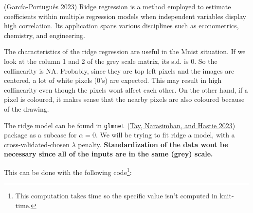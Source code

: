 \documentclass[
  10pt,
]{article}
\newenvironment{Shaded}{\begin{snugshade}}{\end{snugshade}}
\newcommand{\AttributeTok}[1]{\textcolor[rgb]{0.13,0.29,0.53}{#1}}
\newcommand{\CommentTok}[1]{\textcolor[rgb]{0.56,0.35,0.01}{\textit{#1}}}
\newcommand{\ConstantTok}[1]{\textcolor[rgb]{0.56,0.35,0.01}{#1}}
\newcommand{\DecValTok}[1]{\textcolor[rgb]{0.00,0.00,0.81}{#1}}
\newcommand{\FloatTok}[1]{\textcolor[rgb]{0.00,0.00,0.81}{#1}}
\newcommand{\FunctionTok}[1]{\textcolor[rgb]{0.13,0.29,0.53}{\textbf{#1}}}
\newcommand{\NormalTok}[1]{#1}
\newcommand{\OtherTok}[1]{\textcolor[rgb]{0.56,0.35,0.01}{#1}}
\newcommand{\SpecialCharTok}[1]{\textcolor[rgb]{0.81,0.36,0.00}{\textbf{#1}}}
\newcommand{\StringTok}[1]{\textcolor[rgb]{0.31,0.60,0.02}{#1}}
\begin{document}
(\protect\hyperlink{ref-Garcia-Portugues2023}{García-Portugués 2023})
Ridge regression is a method employed to estimate coefficients within
multiple regression models when independent variables display high
correlation. Its application spans various disciplines such as
econometrics, chemistry, and engineering.

The characteristics of the ridge regression are useful in the Mnist
situation. If we look at the column 1 and 2 of the grey scale matrix,
its s.d. is 0. So the collinearity is NA. Probably, since they are top
left pixels and the images are centered, a lot of white pixels (\(0\)'s)
are expected. This may result in high collinearity even though the
pixels wont affect each other. On the other hand, if a pixel is
coloured, it makes sense that the nearby pixels are also coloured
because of the drawing.

The ridge model can be found in \texttt{glmnet}
(\protect\hyperlink{ref-glmnet}{Tay, Narasimhan, and Hastie 2023})
package as a subcase for \(\alpha=0\). We will be trying to fit ridge a
model, with a cross-validated-chosen \(\lambda\) penalty.
\textbf{Standardization of the data wont be necessary since all of the
inputs are in the same (grey) scale.}

This can be done with the following code\footnote{This computation takes
  time so the specific value isn't computed in knit-time.}:

\begin{Shaded}
\end{Shaded}
\end{document}
